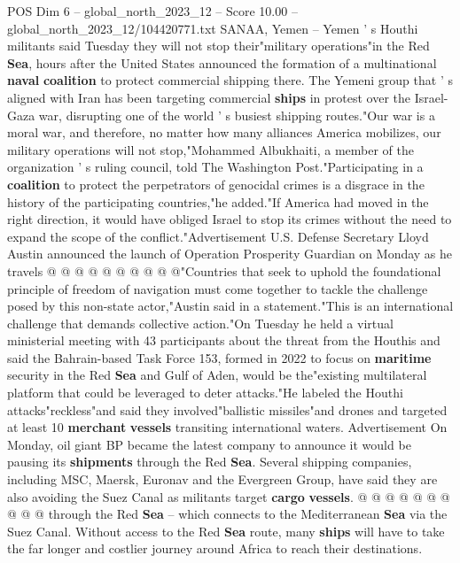 \begin{textsample}{POS Dim 6 – global\_north\_2023\_12 – Score 10.00 – global\_north\_2023\_12/104420771.txt}  \label{ex:f6_pos_135}
SANAA, Yemen -- Yemen ' s Houthi militants said Tuesday they will not stop their"military operations"in the Red \textbf{Sea}, hours after the United States announced the formation of a multinational \textbf{naval} \textbf{coalition} to protect commercial shipping there.
The Yemeni group that ' s aligned with Iran has been targeting commercial \textbf{ships} in protest over the Israel-Gaza war, disrupting one of the world ' s busiest shipping routes."Our war is a moral war, and therefore, no matter how many alliances America mobilizes, our military operations will not stop,"Mohammed Albukhaiti, a member of the organization ' s ruling council, told The Washington Post."Participating in a \textbf{coalition} to protect the perpetrators of genocidal crimes is a disgrace in the history of the participating countries,"he added."If America had moved in the right direction, it would have obliged Israel to stop its crimes without the need to expand the scope of the conflict."Advertisement U.S.
Defense Secretary Lloyd Austin announced the launch of Operation Prosperity Guardian on Monday as he travels @ @ @ @ @ @ @ @ @ @"Countries that seek to uphold the foundational principle of freedom of navigation must come together to tackle the challenge posed by this non-state actor,"Austin said in a statement."This is an international challenge that demands collective action."On Tuesday he held a virtual ministerial meeting with 43 participants about the threat from the Houthis and said the Bahrain-based Task Force 153, formed in 2022 to focus on \textbf{maritime} security in the Red \textbf{Sea} and Gulf of Aden, would be the"existing multilateral platform that could be leveraged to deter attacks."He labeled the Houthi attacks"reckless"and said they involved"ballistic missiles"and drones and targeted at least 10 \textbf{merchant} \textbf{vessels} transiting international waters.
Advertisement On Monday, oil giant BP became the latest company to announce it would be pausing its \textbf{shipments} through the Red \textbf{Sea}.
Several shipping companies, including MSC, Maersk, Euronav and the Evergreen Group, have said they are also avoiding the Suez Canal as militants target \textbf{cargo} \textbf{vessels}. @ @ @ @ @ @ @ @ @ @ through the Red \textbf{Sea} -- which connects to the Mediterranean \textbf{Sea} via the Suez Canal.
Without access to the Red \textbf{Sea} route, many \textbf{ships} will have to take the far longer and costlier journey around Africa to reach their destinations.

\end{textsample}

